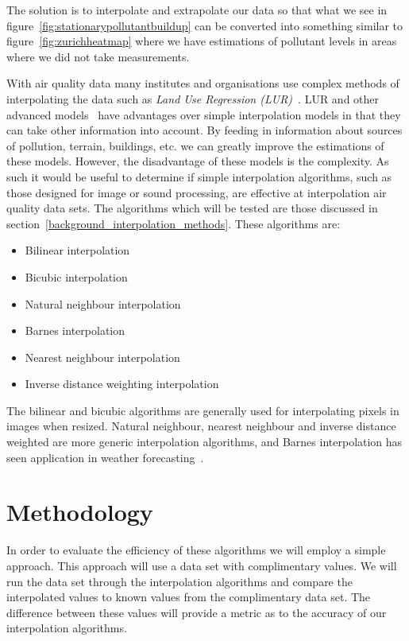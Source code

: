 		The solution is to interpolate and extrapolate our data so that what we see in figure~\ref{fig:stationarypollutantbuildup} can be converted into something similar to figure~\ref{fig:zurichheatmap} where we have estimations of pollutant levels in areas where we did not take measurements. 

		With air quality data many institutes and organisations use complex methods of interpolating the data such as \emph{Land Use Regression (LUR)}~\cite{lurtraffic}. LUR and other advanced models~\cite{reviewofaqmodels} have advantages over simple interpolation models in that they can take other information into account. By feeding in information about sources of pollution, terrain, buildings, etc. we can greatly improve the estimations of these models. However, the disadvantage of these models is the complexity. As such it would be useful to determine if simple interpolation algorithms, such as those designed for image or sound processing, are effective at interpolation air quality data sets. The algorithms which will be tested are those discussed in section~\ref{background_interpolation_methods}. These algorithms are: 

		\begin{itemize}
	        \item Bilinear interpolation
	        \item Bicubic interpolation
	        \item Natural neighbour interpolation
	        \item Barnes interpolation
	        \item Nearest neighbour interpolation
	        \item Inverse distance weighting interpolation
	    \end{itemize}

	    The bilinear and bicubic algorithms are generally used for interpolating pixels in images when resized. Natural neighbour, nearest neighbour and inverse distance weighted are more generic interpolation algorithms, and Barnes interpolation has seen application in weather forecasting~\cite{barnesinterpolation}. 



	\section{Methodology}\label{prediction_evaluation_methodology}

		In order to evaluate the efficiency of these algorithms we will employ a simple approach. This approach will use a data set with complimentary values. We will run the data set through the interpolation algorithms and compare the interpolated values to known values from the complimentary data set. The difference between these values will provide a metric as to the accuracy of our interpolation algorithms. 

